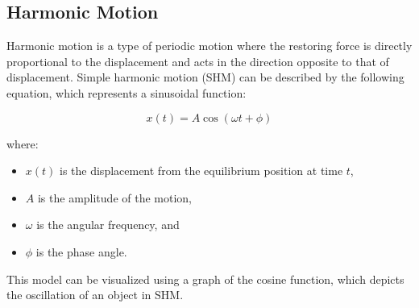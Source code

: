 \documentclass[a4paper,12pt]{book}
\begin{document}

\subsection{Harmonic Motion}
\label{subsec:harmonic_motion}

Harmonic motion is a type of periodic motion where the restoring force is directly proportional to the displacement and acts in the direction opposite to that of displacement. Simple harmonic motion (SHM) can be described by the following equation, which represents a sinusoidal function:

\[ x(t) = A \cos(\omega t + \phi) \]

where:
\begin{itemize}
    \item \( x(t) \) is the displacement from the equilibrium position at time \( t \),
    \item \( A \) is the amplitude of the motion,
    \item \( \omega \) is the angular frequency, and
    \item \( \phi \) is the phase angle.
\end{itemize}

This model can be visualized using a graph of the cosine function, which depicts the oscillation of an object in SHM.

\begin{center}
\end{center}
\end{document}
